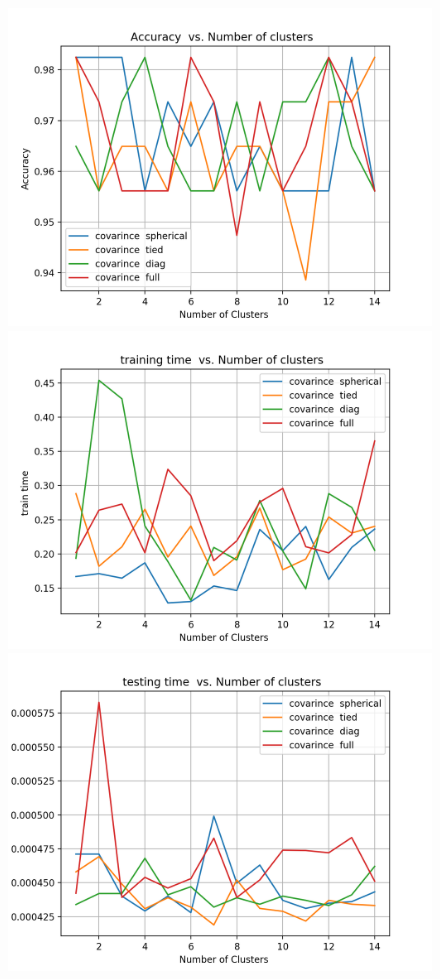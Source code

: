 \documentclass[a4paper,12pt]{article}
\begin{document}
\begin{figure}[!htb]
   \begin{minipage}{0.25\textwidth}
     \centering
     \includegraphics[width=.95\linewidth]{em_acc_nn_5}
   \end{minipage}\hfill
    \begin{minipage}{0.25\textwidth}
     \centering
     \includegraphics[width=.95\linewidth]{em_nn_train_5}
     \end{minipage}\hfill
     \begin{minipage}{0.25\textwidth}
     \centering
     \includegraphics[width=.95\linewidth]{em_test_nn_5}

\end{minipage}
\end{figure}
\end{document}
